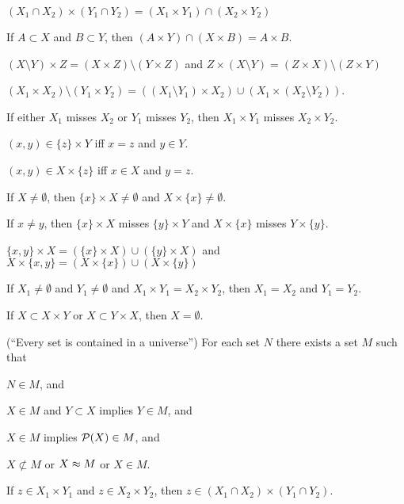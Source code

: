 \documentclass{article}
\begin{document}
\begin{thm}
\item\label{zfmisc1:100}
  $(X_{1}\cap X_{2})\times(Y_{1}\cap Y_{2}) = (X_{1}\times Y_{1})\cap(X_{2}\times Y_{2})$
\item\label{zfmisc1:101} If $A\subset X$ and $B\subset Y$,
  then $(A\times Y)\cap(X\times B)=A\times B$.
\item\label{zfmisc1:102} $(X\setminus Y)\times Z=(X\times Z)\setminus(Y\times Z)$
  and $Z\times(X\setminus Y)=(Z\times X)\setminus(Z\times Y)$
\item\label{zfmisc1:103} $(X_{1}\times X_{2})\setminus(Y_{1}\times Y_{2})=((X_{1}\setminus Y_{1})\times X_{2})\cup(X_{1}\times (X_{2}\setminus Y_{2}))$.
\item\label{zfmisc1:104} If either $X_{1}$ misses $X_{2}$ or $Y_{1}$
  misses $Y_{2}$, then $X_{1}\times Y_{1}$ misses $X_{2}\times Y_{2}$.
\item\label{zfmisc1:105} $(x,y)\in\{z\}\times Y$ iff $x=z$ and $y\in Y$.
\item\label{zfmisc1:106} $(x,y)\in X\times\{z\}$ iff $x\in X$ and $y=z$.
\item\label{zfmisc1:107} If $X\neq\emptyset$, then $\{x\}\times X\neq\emptyset$
  and $X\times\{x\}\neq\emptyset$.
\item\label{zfmisc1:108} If $x\neq y$, then $\{x\}\times X$ misses
  $\{y\}\times Y$ and $X\times\{x\}$ misses $Y\times\{y\}$.
\item\label{zfmisc1:109} $\{x,y\}\times X=(\{x\}\times X)\cup(\{y\}\times X)$
  and $X\times\{x,y\}=(X\times\{x\})\cup(X\times\{y\})$
\item\label{zfmisc1:110} If $X_{1}\neq\emptyset$ and $Y_{1}\neq\emptyset$
  and $X_{1}\times Y_{1}=X_{2}\times Y_{2}$, then $X_{1}=X_{2}$ and $Y_{1}=Y_{2}$.
\item\label{zfmisc1:111} If $X\subset X\times Y$ or $X\subset Y\times X$,
  then $X=\emptyset$.
\item\label{zfmisc1:112} (``Every set is contained in a universe'') For each set $N$ there exists a set $M$ such
  that
  \begin{enumerate*}[label=(\roman*)]
  \item $N\in M$, and
  \item $X\in M$ and $Y\subset X$ implies $Y\in M$, and
  \item $X\in M$ implies $\mathcal{P}(X)\in M$, and
  \item $X\nsubset M$ or $X\approx M$ or $X\in M$.
  \end{enumerate*}
\item\label{zfmisc1:113} If $z\in X_{1}\times Y_{1}$ and $z\in X_{2}\times Y_{2}$,
  then $z\in(X_{1}\cap X_{2})\times(Y_{1}\cap Y_{2})$.
\end{thm}
\end{document}
